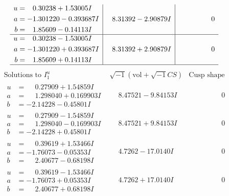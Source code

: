 \documentclass[1p]{elsarticle_modified}
\theoremstyle{definition}
\newcommand{\I}{\sqrt{-1}}
\begin{document}
$$\begin{array}{c|c|c}
\begin{aligned}
u &= \phantom{-}0.30238 + 1.53005 I \\
a &= -1.301220 - 0.393687 I \\
b &= \phantom{-}1.85609 - 0.14113 I\end{aligned}
 & \phantom{-}8.31392 - 2.90879 I & \phantom{-0.000000 } 0 \\ \hline\begin{aligned}
u &= \phantom{-}0.30238 - 1.53005 I \\
a &= -1.301220 + 0.393687 I \\
b &= \phantom{-}1.85609 + 0.14113 I\end{aligned}
 & \phantom{-}8.31392 + 2.90879 I & \phantom{-0.000000 } 0\\
 \hline 
 \end{array}$$\newpage$$\begin{array}{c|c|c}  
\text{Solutions to }I^u_{1}& \I (\text{vol} + \sqrt{-1}CS) & \text{Cusp shape}\\
 \hline 
\begin{aligned}
u &= \phantom{-}0.27909 + 1.54859 I \\
a &= \phantom{-}1.298040 + 0.169903 I \\
b &= -2.14228 - 0.45801 I\end{aligned}
 & \phantom{-}8.47521 - 9.84153 I & \phantom{-0.000000 } 0 \\ \hline\begin{aligned}
u &= \phantom{-}0.27909 - 1.54859 I \\
a &= \phantom{-}1.298040 - 0.169903 I \\
b &= -2.14228 + 0.45801 I\end{aligned}
 & \phantom{-}8.47521 + 9.84153 I & \phantom{-0.000000 } 0 \\ \hline\begin{aligned}
u &= \phantom{-}0.39619 + 1.53466 I \\
a &= -1.76073 - 0.05353 I \\
b &= \phantom{-}2.40677 - 0.68198 I\end{aligned}
 & \phantom{-}4.7262 - 17.0140 I & \phantom{-0.000000 } 0 \\ \hline\begin{aligned}
u &= \phantom{-}0.39619 - 1.53466 I \\
a &= -1.76073 + 0.05353 I \\
b &= \phantom{-}2.40677 + 0.68198 I\end{aligned}
 & \phantom{-}4.7262 + 17.0140 I & \phantom{-0.000000 } 0 \\ \hline\begin{aligned}

\end{aligned}
\end{array}$$
\end{document}
